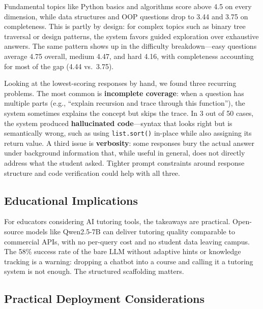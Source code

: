 \documentclass[journal,article,submit,pdftex,moreauthors]{Definitions/mdpi}
\begin{document}
Fundamental topics like Python basics and algorithms score above 4.5 on every dimension, while data structures and OOP questions drop to 3.44 and 3.75 on completeness. This is partly by design: for complex topics such as binary tree traversal or design patterns, the system favors guided exploration over exhaustive answers. The same pattern shows up in the difficulty breakdown---easy questions average 4.75 overall, medium 4.47, and hard 4.16, with completeness accounting for most of the gap (4.44 vs.\ 3.75).

Looking at the lowest-scoring responses by hand, we found three recurring problems. The most common is \textbf{incomplete coverage}: when a question has multiple parts (e.g., ``explain recursion and trace through this function''), the system sometimes explains the concept but skips the trace. In 3 out of 50 cases, the system produced \textbf{hallucinated code}---syntax that looks right but is semantically wrong, such as using \texttt{list.sort()} in-place while also assigning its return value. A third issue is \textbf{verbosity}: some responses bury the actual answer under background information that, while useful in general, does not directly address what the student asked. Tighter prompt constraints around response structure and code verification could help with all three.

\subsection{Educational Implications}

For educators considering AI tutoring tools, the takeaways are practical. Open-source models like Qwen2.5-7B can deliver tutoring quality comparable to commercial APIs, with no per-query cost and no student data leaving campus. The 58\% success rate of the bare LLM without adaptive hints or knowledge tracking is a warning: dropping a chatbot into a course and calling it a tutoring system is not enough. The structured scaffolding matters.

\subsection{Practical Deployment Considerations}
\end{document}
